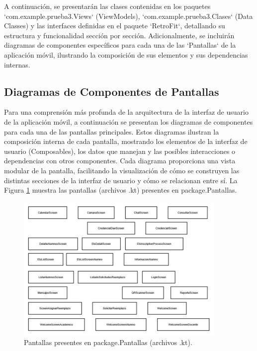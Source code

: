 A continuación, se presentarán las clases contenidas en los paquetes `com.example.prueba3.Views` (ViewModels), `com.example.prueba3.Clases` (Data Classes) y las interfaces definidas en el paquete `RetroFit`, detallando su estructura y funcionalidad sección por sección. Adicionalmente, se incluirán diagramas de componentes específicos para cada una de las `Pantallas` de la aplicación móvil, ilustrando la composición de sus elementos y sus dependencias internas.

\subsection{Diagramas de Componentes de Pantallas}

Para una comprensión más profunda de la arquitectura de la interfaz de usuario de la aplicación móvil, a continuación se presentan los diagramas de componentes para cada una de las pantallas principales. Estos diagramas ilustran la composición interna de cada pantalla, mostrando los elementos de la interfaz de usuario (Composables), los datos que manejan y las posibles interacciones o dependencias con otros componentes. Cada diagrama proporciona una vista modular de la pantalla, facilitando la visualización de cómo se construyen las distintas secciones de la interfaz de usuario y cómo se relacionan entre sí. La Figura \ref{fig:Pantallas} muestra las pantallas (archivos .kt) presentes en package.Pantallas.

\begin{figure}[htbp!]
	\begin{center}
		\includegraphics[width=0.9\textwidth]{DiagramasMoviles/DCM (12)}
		\caption{Pantallas presentes en package.Pantallas (archivos .kt).}
		\label{fig:Pantallas}
	\end{center}
\end{figure}



